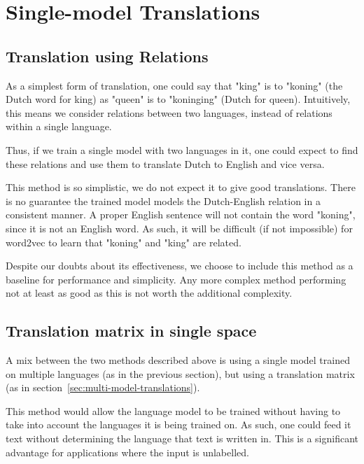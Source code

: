 \section{Single-model Translations}
\label{sec:single-model-translations}

\subsection{Translation using Relations}
As a simplest form of translation, one could say that "king" is to "koning" (the Dutch word for king) as "queen" is to "koninging" (Dutch for queen). Intuitively, this means we consider relations between two languages, instead of relations within a single language.

Thus, if we train a single model with two languages in it, one could expect to find these relations and use them to translate Dutch to English and vice versa.

This method is so simplistic, we do not expect it to give good translations. There is no guarantee the trained model models the Dutch-English relation in a consistent manner. A proper English sentence will not contain the word "koning", since it is not an English word. As such, it will be difficult (if not impossible) for word2vec to learn that "koning" and "king" are related.

Despite our doubts about its effectiveness, we choose to include this method as a baseline for performance and simplicity. Any more complex method performing not at least as good as this is not worth the additional complexity.

\subsection{Translation matrix in single space}
A mix between the two methods described above is using a single model trained on multiple languages (as in the previous section), but using a translation matrix (as in section~\ref{sec:multi-model-translations}).

This method would allow the language model to be trained without having to take into account the languages it is being trained on. As such, one could feed it text without determining the language that text is written in. This is a significant advantage for applications where the input is unlabelled.
